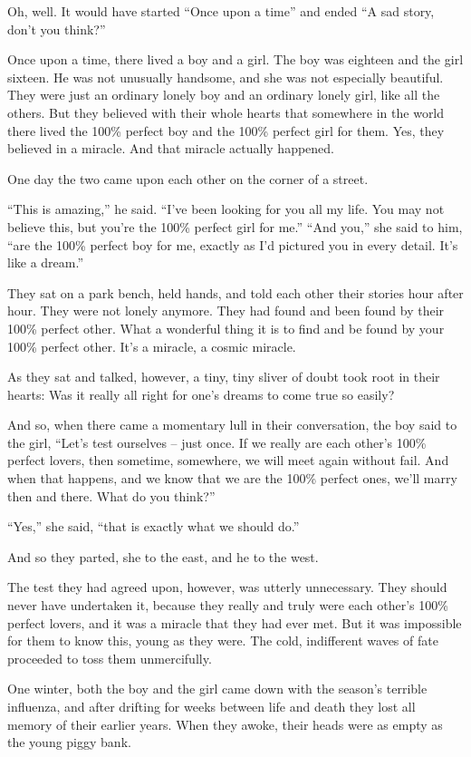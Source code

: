 \documentclass[10pt,a4paper]{article}
\newcommand{\glos}[3]{\dotuline{#1}\marginpar{\scriptsize\textit{#3} #2}}
\begin{document}
Oh, well. It would have started “Once upon a time” and ended “A sad story, don’t you think?”

Once upon a time, there lived a boy and a girl. The boy was eighteen and the girl sixteen. He was not unusually handsome, and she was not especially beautiful. They were just an ordinary lonely boy and an ordinary lonely girl, like all the others. But they believed with their whole hearts that somewhere in the world there lived the 100\% perfect boy and the 100\% perfect girl for them. Yes, they believed in a miracle. And that miracle actually happened.

One day the two came upon each other on the corner of a street.

“This is amazing,” he said. “I’ve been looking for you all my life. You may not believe this, but you’re the 100\% perfect girl for me.”
“And you,” she said to him, “are the 100\% perfect boy for me, exactly as I’d pictured you in every detail. It’s like a dream.”

They sat on a park bench, held hands, and told each other their stories hour after hour. They were not lonely anymore. They had found and been found by their 100\% perfect other. What a wonderful thing it is to find and be found by your 100\% perfect other. It’s a miracle, a cosmic miracle.

As they sat and talked, however, a tiny, tiny sliver of doubt took root in their hearts: Was it really all right for one’s dreams to come true so easily?

And so, when there came a momentary lull in their conversation, the boy said to the girl, “Let’s test ourselves -- just once. If we really are each other’s 100\% perfect lovers, then sometime, somewhere, we will meet again without fail. And when that happens, and we know that we are the 100\% perfect ones, we’ll marry then and there. What do you think?”

“Yes,” she said, “that is exactly what we should do.”

And so they parted, she to the east, and he to the west.

The test they had agreed upon, however, was utterly unnecessary. They should never have undertaken it, because they really and truly were each other’s 100\% perfect lovers, and it was a miracle that they had ever met. But it was impossible for them to know this, young as they were. The cold, indifferent waves of fate proceeded to toss them unmercifully.

One winter, both the boy and the girl came down with the season’s terrible influenza, and after drifting for weeks between life and death they lost all memory of their earlier years. When they awoke, their heads were as empty as the young \glos{D. H. Lawrence’s}{Engelsk forfatter og digter (1885-1930)}{} piggy bank.
\end{document}
